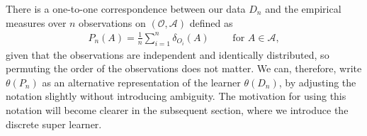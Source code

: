 \documentclass[11pt, a4paper]{article}
\theoremstyle{definition}
\theoremstyle{remark}
\newtheorem{example}{Example}
\newcommand{\btheta}{\theta}
\begin{document}
There is a one-to-one correspondence between our data $ D_n $ and the empirical measures over $ n $ observations on $ (\mathcal{O} , \mathcal{A}) $ defined as
\begin{align*}
    P_n(A) = \frac{1}{n} \sum_{i = 1}^{n} \delta_{O_i}(A)\qquad \text{ for } A \in \mathcal{A},
\end{align*}
given that the observations are independent and identically distributed, so permuting the order of the observations does not matter. We can, therefore, write $ \btheta(P_n)$ as an alternative representation of the learner $\btheta(D_n)$, by adjusting the notation slightly without introducing ambiguity. The motivation for using this notation will become clearer in the subsequent section, where we introduce the discrete super learner.


%
\end{document}
